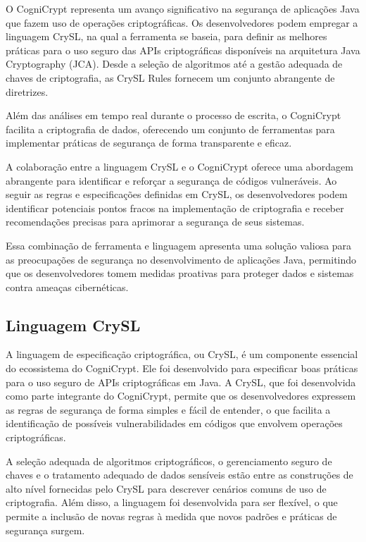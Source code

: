 O CogniCrypt representa um avanço significativo na segurança de aplicações Java que fazem uso de operações criptográficas. Os desenvolvedores podem empregar a linguagem CrySL, na qual a ferramenta se baseia, para definir as melhores práticas para o uso seguro das APIs criptográficas disponíveis na arquitetura Java Cryptography (JCA). Desde a seleção de algoritmos até a gestão adequada de chaves de criptografia, as CrySL Rules fornecem um conjunto abrangente de diretrizes.

Além das análises em tempo real durante o processo de escrita, o CogniCrypt facilita a criptografia de dados, oferecendo um conjunto de ferramentas para implementar práticas de segurança de forma transparente e eficaz.

A colaboração entre a linguagem CrySL e o CogniCrypt oferece uma abordagem abrangente para identificar e reforçar a segurança de códigos vulneráveis. Ao seguir as regras e especificações definidas em CrySL, os desenvolvedores podem identificar potenciais pontos fracos na implementação de criptografia e receber recomendações precisas para aprimorar a segurança de seus sistemas.

Essa combinação de ferramenta e linguagem apresenta uma solução valiosa para as preocupações de segurança no desenvolvimento de aplicações Java, permitindo que os desenvolvedores tomem medidas proativas para proteger dados e sistemas contra ameaças cibernéticas.

\subsection{Linguagem CrySL} %

A linguagem de especificação criptográfica, ou CrySL, é um componente essencial do ecossistema do CogniCrypt. Ele foi desenvolvido para especificar boas práticas para o uso seguro de APIs criptográficas em Java. A CrySL, que foi desenvolvida como parte integrante do CogniCrypt, permite que os desenvolvedores expressem as regras de segurança de forma simples e fácil de entender, o que facilita a identificação de possíveis vulnerabilidades em códigos que envolvem operações criptográficas.

A seleção adequada de algoritmos criptográficos, o gerenciamento seguro de chaves e o tratamento adequado de dados sensíveis estão entre as construções de alto nível fornecidas pelo CrySL para descrever cenários comuns de uso de criptografia. Além disso, a linguagem foi desenvolvida para ser flexível, o que permite a inclusão de novas regras à medida que novos padrões e práticas de segurança surgem.


